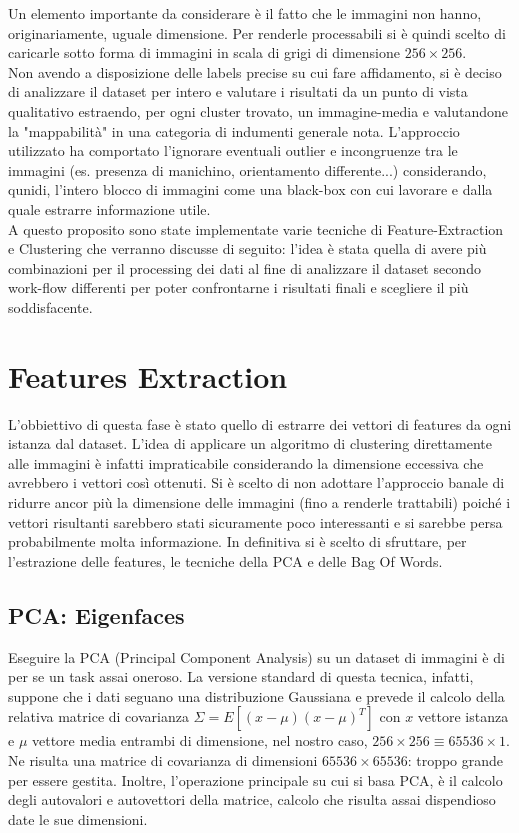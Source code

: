 \documentclass[]{report}
\begin{document}
	Un elemento importante da considerare è il fatto che le immagini non hanno, originariamente, uguale dimensione. Per renderle processabili si è quindi scelto di caricarle sotto forma di immagini in scala di grigi di dimensione $256\times256$. \\
	Non avendo a disposizione delle labels precise su cui fare affidamento, si è deciso di analizzare il dataset per intero e valutare i risultati da un punto di vista qualitativo estraendo, per ogni cluster trovato, un immagine-media e valutandone la "mappabilità" in una categoria di indumenti generale nota. L'approccio utilizzato ha comportato l'ignorare eventuali outlier e incongruenze tra le immagini (es. presenza di manichino, orientamento differente...) considerando, qunidi, l'intero blocco di immagini come una black-box con cui lavorare e dalla quale estrarre informazione utile. \\
	A questo proposito sono state implementate varie tecniche di Feature-Extraction e Clustering che verranno discusse di seguito: l'idea è stata quella di avere più combinazioni per il processing dei dati al fine di analizzare il dataset secondo work-flow differenti per poter confrontarne i risultati finali e scegliere il più soddisfacente.
	
 

\chapter*{\huge Features Extraction}

	L'obbiettivo di questa fase è stato quello di estrarre dei vettori di features da ogni istanza dal dataset. L'idea di applicare un algoritmo di clustering direttamente alle immagini è infatti impraticabile considerando la dimensione eccessiva che avrebbero i vettori così ottenuti. Si è scelto di non adottare l'approccio banale di ridurre ancor più la dimensione delle immagini (fino a renderle trattabili) poiché i vettori risultanti sarebbero stati sicuramente poco interessanti e si sarebbe persa probabilmente molta informazione. In definitiva si è scelto di sfruttare, per l'estrazione delle features, le tecniche della PCA e delle Bag Of Words. 

\section*{PCA: Eigenfaces}

	Eseguire la PCA (Principal Component Analysis) su un dataset di immagini è di per se un task assai oneroso. La versione standard di questa tecnica, infatti, suppone che i dati seguano una distribuzione Gaussiana e prevede il calcolo della relativa matrice di covarianza $\Sigma = E[(x-\mu)(x-\mu)^{T}]$ con $x$ vettore istanza e $\mu$ vettore media entrambi di dimensione, nel nostro caso, $256\times256 \equiv 65536\times1$. Ne risulta una matrice di covarianza di dimensioni $65536\times65536$: troppo grande per essere gestita. Inoltre, l'operazione principale su cui si basa PCA, è il calcolo degli autovalori e autovettori della matrice, calcolo che risulta assai dispendioso date le sue dimensioni. 
	
\end{document}
